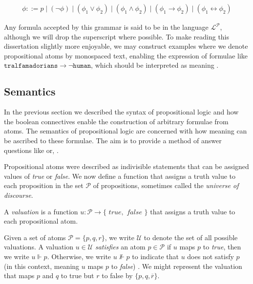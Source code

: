 \begin{align}
  \phi ::= p \mid (\neg \phi) \mid (\phi_1 \lor \phi_2) \mid (\phi_1 \land \phi_2) \mid (\phi_1 \rightarrow \phi_2) \mid (\phi_1 \leftrightarrow \phi_2)
\end{align}

Any formula accepted by this grammar is said to be in the language $\mathcal{L}^\mathcal{P}$, although we will drop the superscript where possible.
To make reading this dissertation slightly more enjoyable, we may construct examples where we denote propositional atoms by monospaced text, enabling the expression of formulae like $\texttt{tralfamadorians} \rightarrow \neg \texttt{human}$, which should be interpreted as meaning .

\subsection{Semantics}
\label{subsection:semantics}
In the previous section we described the syntax of propositional logic and how the boolean connectives enable the construction of arbitrary formulae from atoms. The semantics of propositional logic are concerned with how meaning can be ascribed to these formulae. The aim is to provide a method of answer questions like  or, .

Propositional atoms were described as indivisible statements that can be assigned values of \textit{true} or \textit{false}. We now define a function that assigns a truth value to each proposition in the set $\mathcal{P}$ of propositions, sometimes called the \textit{universe of discourse}. 

\begin{definition}
  \label{definition:valuation} 
  A \textit{valuation} is a function \(u : \mathcal{P} \to \{\textit{ true}, \textit{ false }\}\) that assigns a truth value to each propositional atom.
\end{definition}

Given a set of atoms $\mathcal{P} = \{p,q,r\}$, we write $\mathcal{U}$ to denote the set of all possible valuations. A valuation $u \in \mathcal{U}$ \textit{satisfies} an atom $p \in \mathcal{P}$ if $u$ maps $p$ to \textit{true}, then we write $u \Vdash p$. Otherwise, we write $u \nVdash p$ to indicate that $u$ does not satisfy $p$ (in this context, meaning $u$ maps $p$ to \textit{false}) \cite[p. 16]{Ben1993Mathematical}. We might represent the valuation that maps $p$ and $q$ to true but $r$ to false by $\{p,q,\overline{r}\}$.

